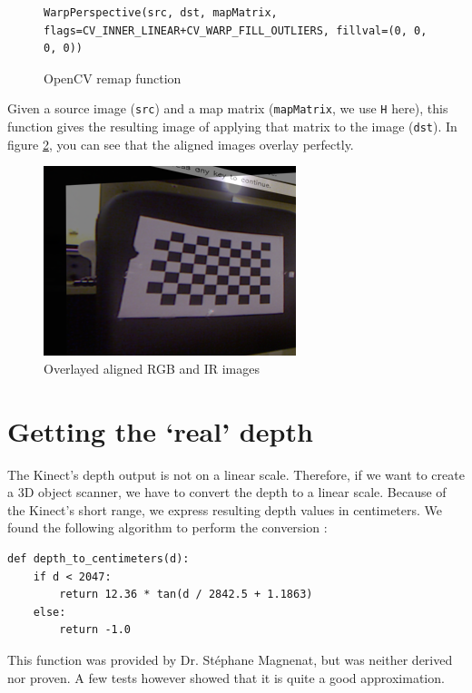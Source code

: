 \begin{figure}[H]
\begin{lstlisting}
WarpPerspective(src, dst, mapMatrix, flags=CV_INNER_LINEAR+CV_WARP_FILL_OUTLIERS, fillval=(0, 0, 0, 0))
\end{lstlisting}
\caption{OpenCV remap function}
\label{code:warpperspective}
\end{figure}

Given a source image (\verb|src|) and a map matrix (\verb|mapMatrix|, we use
\verb|H| here), this function gives the resulting image of applying that matrix
to the image (\verb|dst|). In figure \ref{fig:aligned}, you can see that the
aligned images overlay perfectly.

\begin{figure}[H]
\centering
\includegraphics[scale=0.6]{images/aligned.png}
\caption{Overlayed aligned RGB and IR images}
\label{fig:aligned}
\end{figure}


\section{Getting the `real' depth}

The Kinect's depth output is not on a linear scale. Therefore, if we want to
create a 3D object scanner, we have to convert the depth to a linear scale.
Because of the Kinect's short range, we express resulting depth values in
centimeters.  We found the following algorithm to perform the conversion
\cite{MAGNENAT}:

\begin{lstlisting}
def depth_to_centimeters(d):
    if d < 2047:
        return 12.36 * tan(d / 2842.5 + 1.1863)
    else:
        return -1.0
\end{lstlisting}

This function was provided by Dr. St\'ephane Magnenat, but was neither derived
nor proven. A few tests however showed that it is quite a good approximation.

